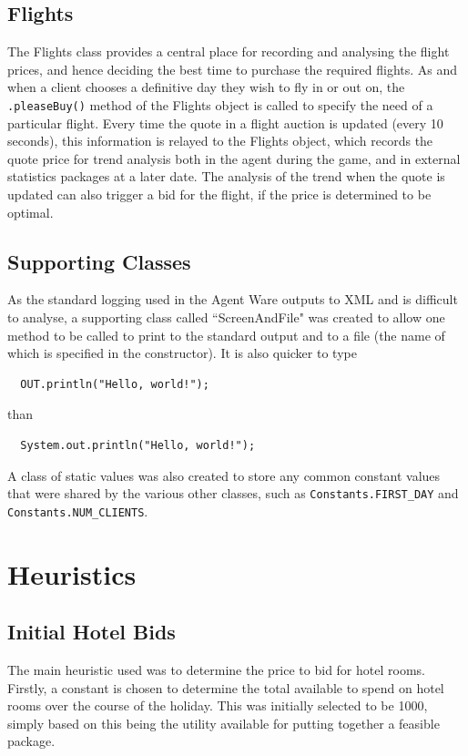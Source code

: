 \documentclass{acm_proc_article-sp}
\begin{document}
  \subsection{Flights}
   The Flights class provides a central place for recording and analysing the flight prices, and hence deciding the best time to purchase the required flights.  As and when a client chooses a definitive day they wish to fly in or out on, the \verb".pleaseBuy()" method of the Flights object is called to specify the need of a particular flight.  Every time the quote in a flight auction is updated (every 10 seconds), this information is relayed to the Flights object, which records the quote price for trend analysis both in the agent during the game, and in external statistics packages at a later date.  The analysis of the trend when the quote is updated can also trigger a bid for the flight, if the price is determined to be optimal.
   
  \subsection{Supporting Classes}
   As the standard logging used in the Agent Ware outputs to XML and is difficult to analyse, a supporting class called ``ScreenAndFile" was created to allow one method to be called to print to the standard output and to a file (the name of which is specified in the constructor).  It is also quicker to type \begin{verbatim}  OUT.println("Hello, world!");\end{verbatim} than \begin{verbatim}  System.out.println("Hello, world!");\end{verbatim}
   
   A class of static values was also created to store any common constant values that were shared by the various other classes, such as \verb"Constants.FIRST_DAY" and \verb"Constants.NUM_CLIENTS".

\section{Heuristics}
 \label{heuristics}
 \subsection{Initial Hotel Bids}
  The main heuristic used was to determine the price to bid for hotel rooms.  Firstly, a constant is chosen to determine the total available to spend on hotel rooms over the course of the holiday.  This was initially selected to be 1000, simply based on this being the utility available for putting together a feasible package.
  
\end{document}

